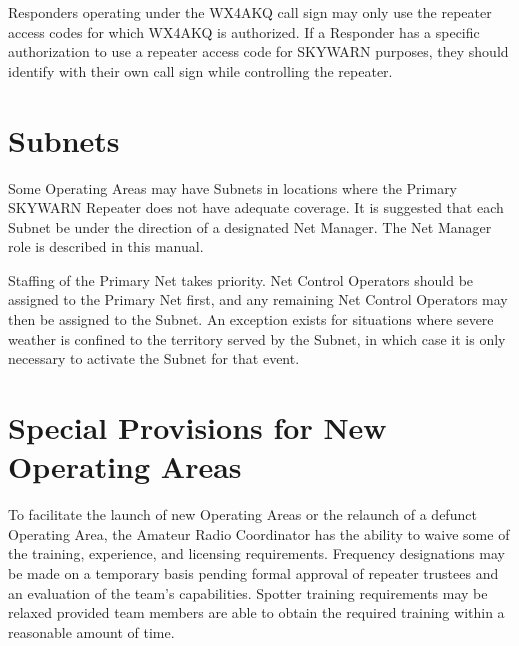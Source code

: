 \documentclass[pdflatex,letterpaper,twoside,12pt]{book}
\begin{document}
Responders operating under the WX4AKQ call sign may only use the repeater access codes for which WX4AKQ is authorized.  If a Responder has a specific authorization to use a repeater access code for SKYWARN purposes, they should identify with their own call sign while controlling the repeater.


\section{Subnets}

Some Operating Areas may have Subnets in locations where the Primary SKYWARN Repeater does not have adequate coverage.  It is suggested that each Subnet be under the direction of a designated Net Manager.  The Net Manager role is described in this manual. 

Staffing of the Primary Net takes priority.  Net Control Operators should be assigned to the Primary Net first, and any remaining Net Control Operators may then be assigned to the Subnet.  An exception exists for situations where severe weather is confined to the territory served by the Subnet, in which case it is only necessary to activate the Subnet for that event.


\section{Special Provisions for New Operating Areas}

To facilitate the launch of new Operating Areas or the relaunch of a defunct Operating Area, the Amateur Radio Coordinator has the ability to waive some of the training, experience, and licensing requirements.  Frequency designations may be made on a temporary basis pending formal approval of repeater trustees and an evaluation of the team's capabilities.  Spotter training requirements may be relaxed provided team members are able to obtain the required training within a reasonable amount of time.

\end{document}
